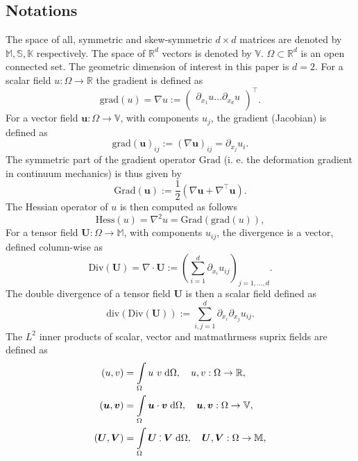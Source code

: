 \documentclass{ifacconf}
\def\onedot{$\mathsurround0pt\ldotp$}
\def\cddot{%
	\mathbin{\vcenter{\baselineskip.67ex
			\hbox{\onedot}\hbox{\onedot}}%
}}
\begin{document}
\subsection{Notations}
The space of all, symmetric and skew-symmetric $d\times d$ matrices are denoted by $\mathbb{M}, \mathbb{S}, \mathbb{K}$ respectively. The space of $\mathbb{R}^d$ vectors is denoted by $\mathbb{V}$. $\Omega \subset \mathbb{R}^d$ is an open connected set. The geometric dimension of interest in this paper is $d=2$. For a scalar field $u: \Omega \rightarrow \mathbb{R}$ the gradient is defined as 
\begin{equation*}
\mathrm{grad}(u) =  \nabla u := \begin{pmatrix}
\partial_{x_1} u \dots \partial_{x_d} u \\
\end{pmatrix}^\top.
\end{equation*}
For a vector field $\bm{u}: \Omega \rightarrow \mathbb{V}$, with components $u_j$, the gradient (Jacobian) is defined as
\begin{equation*}
\mathrm{grad}(\bm{u})_{i j}:= (\nabla \bm{u})_{ij} = \partial_{x_j} u_i.
\end{equation*}
The symmetric part of the gradient operator $\mathrm{Grad}$ (i. e. the deformation gradient in continuum mechanics) is thus given by
\begin{equation*}
\mathrm{Grad}(\bm{u}) := \frac{1}{2} \left(\nabla \bm{u} + \nabla^\top \bm{u} \right).
\end{equation*}
The Hessian operator of $u$ is then computed as follows
\begin{equation*}
\mathrm{Hess}(u) = \nabla^2 u = \mathrm{Grad}(\mathrm{grad}(u)),
\end{equation*}
For a tensor field $\bm{U}: \Omega \rightarrow \mathbb{M}$, with components $u_{ij}$, the divergence is a vector, defined column-wise as
\begin{equation*}
\mathrm{Div}(\bm U) = \nabla \cdot \bm{U} := \left( \sum_{i = 1}^d \partial_{x_i} u_{ij} \right)_{j = 1, \dots, d}.
\end{equation*}
The double divergence of a tensor field $\bm{U}$ is then a scalar field defined as
\begin{equation*}
\mathrm{div}(\mathrm{Div}(\bm U)):= \sum_{i, j = 1}^d \partial_{x_i} \partial_{x_j} u_{ij}.
\end{equation*}
The $L^2$ inner products of scalar, vector and matmathrm{ess \; sup}rix fields are defined as
\begin{align*}
	(u, v) &= \int_{\Omega} u \ v \d\Omega, \quad u, v : \Omega \rightarrow \mathbb{R}, \\
	(\bm{u}, \bm{v}) &= \int_{\Omega} \bm{u} \cdot \bm{v} \d\Omega, \quad \bm{u}, \bm{v} : \Omega \rightarrow \mathbb{V}, \\
	(\bm{U}, \bm{V}) &= \int_{\Omega} \bm{U} \cddot \bm{V} \d\Omega, \quad \bm{U}, \bm{V} : \Omega \rightarrow \mathbb{M},
\end{align*}
\end{document}
